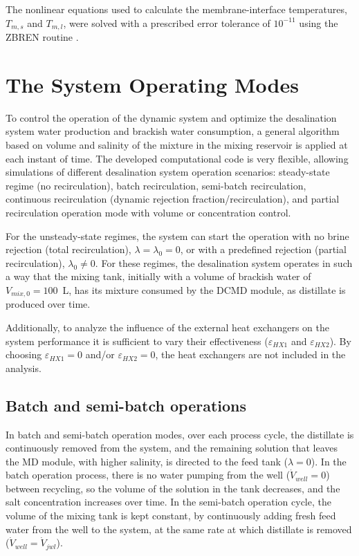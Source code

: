 \documentclass[14pt,letterpaper,fleqn]{extarticle}
\begin{document}
The nonlinear equations used to calculate the membrane-interface
temperatures, $T_{m,s}$ and $T_{m,l}$, were solved with a prescribed error
tolerance of $10^{-11}$ using the ZBREN routine \citep{IMSL2022}.

\section{The System Operating Modes}

To control the operation of the dynamic system and optimize the desalination system water
production and brackish water consumption, a general algorithm based on volume and
salinity of the mixture in the mixing reservoir is applied at each instant of time. The
developed computational code is very flexible, allowing simulations of different
desalination system operation scenarios: steady-state regime (no recirculation), batch
recirculation, semi-batch recirculation, continuous recirculation (dynamic rejection
fraction/recirculation), and partial recirculation operation mode with volume or
concentration control.

For the unsteady-state regimes, the system can start the operation with no brine
rejection (total recirculation), $\lambda=\lambda_0=0$, or with a predefined
rejection (partial recirculation), $\lambda_0\neq0$. For these regimes, the
desalination system operates in such a way that the mixing tank, initially with a volume
of brackish water of $V_{mix,0}=100$~L, has its mixture consumed by the DCMD module,
as distillate is produced over time.

Additionally, to analyze the influence of the external heat exchangers on the system
performance it is sufficient to vary their effectiveness ($\varepsilon_{HX1}$ and
$\varepsilon_{HX2}$). By choosing $\varepsilon_{HX1}=0$ and/or $\varepsilon_{HX2}=0$,
the heat exchangers are not included in the analysis.

\subsection{Batch and semi-batch operations}
\label{subsec:batch-semibatch}

In batch and semi-batch operation modes, over each process cycle, the distillate is
continuously removed from the system, and the remaining solution that leaves the MD
module, with higher salinity, is directed to the feed tank ($\lambda=0$). In the batch
operation process, there is no water pumping from the well ($\dot{V}_{well}=0$) between
recycling, so the volume of the solution in the tank decreases, and the salt concentration
increases over time. In the semi-batch operation cycle, the volume of the mixing tank is
kept constant, by continuously adding fresh feed water from the well to the system, at
the same rate at which distillate is removed ($\dot{V}_{well}=\dot{V}_{jwl}$).
\end{document}
